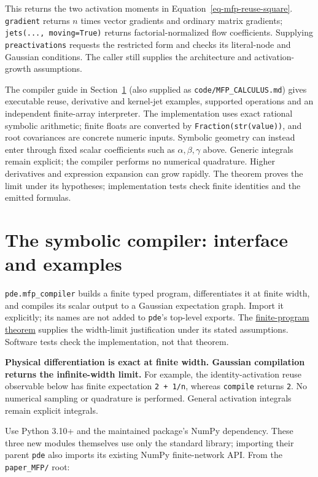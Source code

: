 \documentclass[
  11pt,
]{article}
\theoremstyle{definition}
\theoremstyle{plain}
\theoremstyle{plain}
\theoremstyle{plain}
\theoremstyle{remark}
\begin{document}
This returns the two activation moments in
Equation~\ref{eq-mfp-reuse-square}. \texttt{gradient} returns \(n\)
times vector gradients and ordinary matrix gradients;
\texttt{jets(...,\ moving=True)} returns factorial-normalized flow
coefficients. Supplying \texttt{preactivations} requests the restricted
form and checks its literal-node and Gaussian conditions. The caller
still supplies the architecture and activation-growth assumptions.

The compiler guide in Section~\ref{sec-compiler-guide} (also supplied as
\texttt{code/MFP\_CALCULUS.md}) gives executable reuse, derivative and
kernel-jet examples, supported operations and an independent
finite-array interpreter. The implementation uses exact rational
symbolic arithmetic; finite floats are converted by
\texttt{Fraction(str(value))}, and root covariances are concrete numeric
inputs. Symbolic geometry can instead enter through fixed scalar
coefficients such as \(\alpha,\beta,\gamma\) above. Generic integrals
remain explicit; the compiler performs no numerical quadrature. Higher
derivatives and expression expansion can grow rapidly. The theorem
proves the limit under its hypotheses; implementation tests check finite
identities and the emitted formulas.

\section{The symbolic compiler: interface and
examples}\label{sec-compiler-guide}

\texttt{pde.mfp\_compiler} builds a finite typed program, differentiates
it at finite width, and compiles its scalar output to a Gaussian
expectation graph. Import it explicitly; its names are not added to
\texttt{pde}'s top-level exports. The
\hyperref[sec-mfp-finite-derivative-programs]{finite-program theorem}
supplies the width-limit justification under its stated assumptions.
Software tests check the implementation, not that theorem.

\textbf{Physical differentiation is exact at finite width. Gaussian
compilation returns the infinite-width limit.} For example, the
identity-activation reuse observable below has finite expectation
\texttt{2\ +\ 1/n}, whereas \texttt{compile} returns \texttt{2}. No
numerical sampling or quadrature is performed. General activation
integrals remain explicit integrals.

Use Python 3.10+ and the maintained package's NumPy dependency. These
three new modules themselves use only the standard library; importing
their parent \texttt{pde} also imports its existing NumPy finite-network
API. From the \texttt{paper\_MFP/} root:
\end{document}
